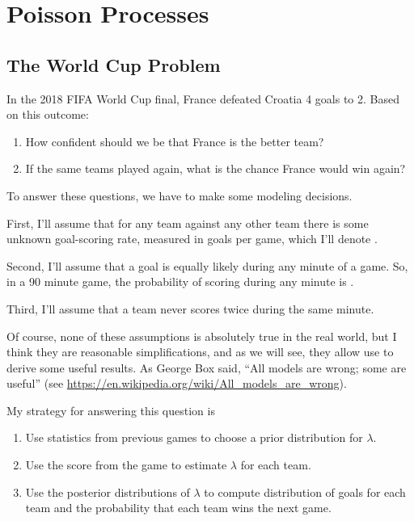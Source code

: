 \documentclass[12pt]{book}
\theoremstyle{exercise}
\begin{document}
\chapter{Poisson Processes}
\label{prediction}

\section{The World Cup Problem}

In the 2018 FIFA World Cup final, France defeated Croatia 4 goals to 2.  Based on this outcome:

\begin{enumerate}

\item How confident should we be that France is the better team?

\item If the same teams played again, what is the chance France would win again?

\end{enumerate}


To answer these questions, we have to make some modeling decisions.

First, I'll assume that for any team against any other team there is some unknown goal-scoring rate, measured in goals per game, which I'll denote .

Second, I'll assume that a goal is equally likely during any minute of a game.  So, in a 90 minute game, the probability of scoring during any minute is .

Third, I'll assume that a team never scores twice during the same minute.

Of course, none of these assumptions is absolutely true in the real world, but I think they are reasonable simplifications, and as we will see, they allow use to derive some useful results.
As George Box said, ``All models are wrong; some are useful''
(see \url{https://en.wikipedia.org/wiki/All_models_are_wrong}).

My strategy for answering this question is

\begin{enumerate}

\item Use statistics from previous games to choose a prior
distribution for $\lambda$.

\item Use the score from the game to estimate $\lambda$
for each team.

\item Use the posterior distributions of $\lambda$ to compute 
distribution of goals for each team and the probability that each team wins
the next game.

\end{enumerate}
\end{document}
